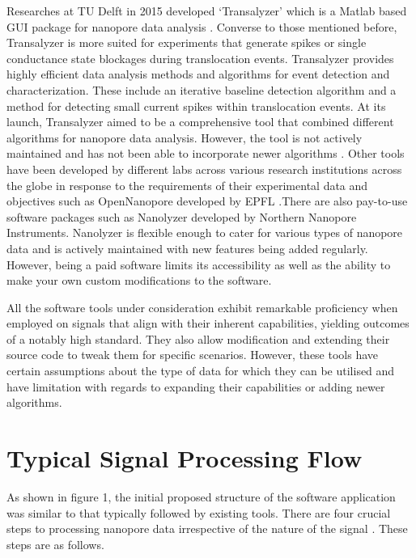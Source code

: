 \documentclass[journal]{IEEEtran}
\begin{document}
Researches at TU Delft in 2015 developed ‘Transalyzer’ which is a Matlab based GUI package for nanopore data analysis \cite{plesaDataAnalysisMethods2015}. Converse to those mentioned before, Transalyzer is more suited for experiments that generate spikes or single conductance state blockages during translocation events. Transalyzer provides highly efficient data analysis methods and algorithms for event detection and characterization. These include an iterative baseline detection algorithm and a method for detecting small current spikes within translocation events. At its launch, Transalyzer aimed to be a comprehensive tool that combined different algorithms for nanopore data analysis. However, the tool is not actively maintained and has not been able to incorporate newer algorithms \cite{plesaDataAnalysisMethods2015}. Other tools have been developed by different labs across various research institutions across the globe in response to the requirements of their experimental data and objectives such as OpenNanopore developed by EPFL \cite{raillonFastAutomaticProcessing2012}.There are also pay-to-use software packages such as Nanolyzer developed by Northern Nanopore Instruments. Nanolyzer is flexible enough to cater for various types of nanopore data and is actively maintained with new features being added regularly. However, being a paid software limits its accessibility as well as the ability to make your own custom modifications to the software.

All the software tools under consideration exhibit remarkable proficiency when employed on signals that align with their inherent capabilities, yielding outcomes of a notably high standard. They also allow modification and extending their source code to tweak them for specific scenarios. However, these tools have certain assumptions about the type of data for which they can be utilised and have limitation with regards to expanding their capabilities or adding newer algorithms.

\section{Typical Signal Processing Flow}

As shown in figure 1, the initial proposed structure of the software application was similar to that typically followed by existing tools. There are four crucial steps to processing nanopore data irrespective of the nature of the signal \cite{forstaterMOSAICModularSingleMolecule2016,gokhaleAdvancedSignalProcessing2023,plesaDataAnalysisMethods2015,wenGuideSignalProcessing2021}. These steps are as follows.
\end{document}
